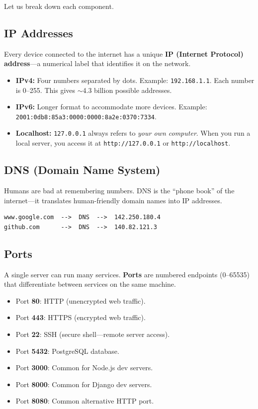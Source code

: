 \documentclass[12pt, a4paper, oneside]{book}
\begin{document}
Let us break down each component.

\subsection{IP Addresses}

Every device connected to the internet has a unique \textbf{IP (Internet Protocol) address}---a numerical label that identifies it on the network.

\begin{itemize}[leftmargin=2em]
    \item \textbf{IPv4:} Four numbers separated by dots. Example: \texttt{192.168.1.1}. Each number is 0--255. This gives $\sim$4.3 billion possible addresses.
    \item \textbf{IPv6:} Longer format to accommodate more devices. Example: \texttt{2001:0db8:85a3:0000:0000:8a2e:0370:7334}.
    \item \textbf{Localhost:} \texttt{127.0.0.1} always refers to \emph{your own computer}. When you run a local server, you access it at \texttt{http://127.0.0.1} or \texttt{http://localhost}.
\end{itemize}

\subsection{DNS (Domain Name System)}

Humans are bad at remembering numbers. DNS is the ``phone book'' of the internet---it translates human-friendly domain names into IP addresses.

\begin{verbatim}
www.google.com  -->  DNS  -->  142.250.180.4
github.com      -->  DNS  -->  140.82.121.3
\end{verbatim}

\subsection{Ports}

A single server can run many services. \textbf{Ports} are numbered endpoints (0--65535) that differentiate between services on the same machine.

\begin{itemize}[leftmargin=2em]
    \item Port \textbf{80}: HTTP (unencrypted web traffic).
    \item Port \textbf{443}: HTTPS (encrypted web traffic).
    \item Port \textbf{22}: SSH (secure shell---remote server access).
    \item Port \textbf{5432}: PostgreSQL database.
    \item Port \textbf{3000}: Common for Node.js dev servers.
    \item Port \textbf{8000}: Common for Django dev servers.
    \item Port \textbf{8080}: Common alternative HTTP port.
\end{itemize}
\end{document}
